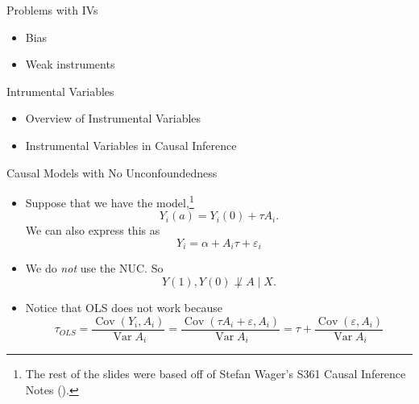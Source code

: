 \documentclass[handout]{beamer} %
\DeclareMathOperator*{\Cov}{Cov}
\DeclareMathOperator*{\Var}{Var}
\begin{document}
\begin{frame}{Problems with IVs}

  \begin{itemize}
    \item<2-> Bias
    \item<3-> Weak instruments
  \end{itemize}
  
\end{frame}

\begin{frame}{Intrumental Variables}

{

\begin{itemize}
    \item<0> Overview of Instrumental Variables
    \item<1> Instrumental Variables in Causal Inference
\end{itemize}
}

\end{frame}

\begin{frame}{Causal Models with No Unconfoundedness}

  \begin{itemize}
    \item Suppose that we have the model,\footnote{The rest of the slides were
      based off of Stefan Wager's S361 Causal Inference Notes
      (\cite{wager2020stats}).}
      \[Y_i(a) = Y_i(0) + \tau A_i.\]
      We can also express this as 
      \[Y_i = \alpha + A_i \tau + \varepsilon_i\]
    \item We do \textit{not} use the NUC. So 
      \[Y(1), Y(0) \not\perp A \mid X.\]
    \item Notice that OLS does not work because
      \[\tau_{OLS} = \frac{\Cov(Y_i, A_i)}{\Var{A_i}} = 
      \frac{\Cov(\tau A_i + \varepsilon, A_i)}{\Var{A_i}} =
      \tau + 
      \frac{\Cov(\varepsilon, A_i)}{\Var{A_i}}\]
  \end{itemize}
  
\end{frame}
\end{document}
